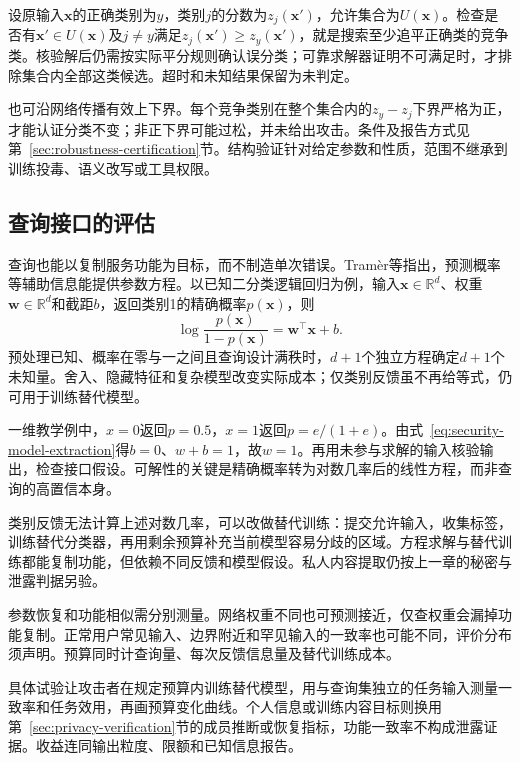 设原输入$\bm{x}$的正确类别为$y$，类别$j$的分数为$z_j(\bm{x}')$，允许集合为$U(\bm{x})$。检查是否有$\bm{x}'\in U(\bm{x})$及$j\ne y$满足$z_j(\bm{x}')\geq z_y(\bm{x}')$，就是搜索至少追平正确类的竞争类。核验解后仍需按实际平分规则确认误分类；可靠求解器证明不可满足时，才排除集合内全部这类候选。超时和未知结果保留为未判定。

也可沿网络传播有效上下界。每个竞争类别在整个集合内的$z_y-z_j$下界严格为正，才能认证分类不变；非正下界可能过松，并未给出攻击。条件及报告方式见第~\ref{sec:robustness-certification}节。结构验证针对给定参数和性质，范围不继承到训练投毒、语义改写或工具权限。

\subsection{查询接口的评估}
\label{sec:security-information-test}

查询也能以复制服务功能为目标，而不制造单次错误。Tramèr等指出，预测概率等辅助信息能提供参数方程。以已知二分类逻辑回归为例，输入$\bm{x}\in\mathbb R^d$、权重$\bm{w}\in\mathbb R^d$和截距$b$，返回类别1的精确概率$p(\bm{x})$，则
\begin{equation}
 \log\frac{p(\bm{x})}{1-p(\bm{x})}
 =\bm{w}^{\top}\bm{x}+b.
 \label{eq:security-model-extraction}
\end{equation}
预处理已知、概率在零与一之间且查询设计满秩时，$d+1$个独立方程确定$d+1$个未知量。舍入、隐藏特征和复杂模型改变实际成本；仅类别反馈虽不再给等式，仍可用于训练替代模型。

一维教学例中，$x=0$返回$p=0.5$，$x=1$返回$p=e/(1+e)$。由式~\eqref{eq:security-model-extraction}得$b=0$、$w+b=1$，故$w=1$。再用未参与求解的输入核验输出，检查接口假设。可解性的关键是精确概率转为对数几率后的线性方程，而非查询的高置信本身。

类别反馈无法计算上述对数几率，可以改做替代训练：提交允许输入，收集标签，训练替代分类器，再用剩余预算补充当前模型容易分歧的区域。方程求解与替代训练都能复制功能，但依赖不同反馈和模型假设。私人内容提取仍按上一章的秘密与泄露判据另验。

参数恢复和功能相似需分别测量。网络权重不同也可预测接近，仅查权重会漏掉功能复制。正常用户常见输入、边界附近和罕见输入的一致率也可能不同，评价分布须声明。预算同时计查询量、每次反馈信息量及替代训练成本。

具体试验让攻击者在规定预算内训练替代模型，用与查询集独立的任务输入测量一致率和任务效用，再画预算变化曲线。个人信息或训练内容目标则换用第~\ref{sec:privacy-verification}节的成员推断或恢复指标，功能一致率不构成泄露证据。收益连同输出粒度、限额和已知信息报告。

